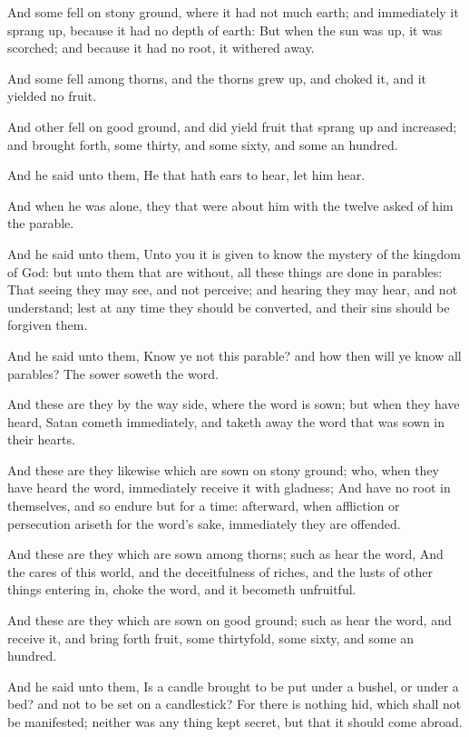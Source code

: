 \Verse And some fell on stony ground, where it had not much earth; and immediately it sprang up, because it had no depth of earth: \Verse But when the sun was up, it was scorched; and because it had no root, it withered away.

\Verse And some fell among thorns, and the thorns grew up, and choked it, and it yielded no fruit.

\Verse And other fell on good ground, and did yield fruit that sprang up and increased; and brought forth, some thirty, and some sixty, and some an hundred.

\Verse And he said unto them, He that hath ears to hear, let him hear.

\Verse And when he was alone, they that were about him with the twelve asked of him the parable.

\Verse And he said unto them, Unto you it is given to know the mystery of the kingdom of God: but unto them that are without, all these things are done in parables: \Verse That seeing they may see, and not perceive; and hearing they may hear, and not understand; lest at any time they should be converted, and their sins should be forgiven them.

\Verse And he said unto them, Know ye not this parable? and how then will ye know all parables?  \Verse The sower soweth the word.

\Verse And these are they by the way side, where the word is sown; but when they have heard, Satan cometh immediately, and taketh away the word that was sown in their hearts.

\Verse And these are they likewise which are sown on stony ground; who, when they have heard the word, immediately receive it with gladness; \Verse And have no root in themselves, and so endure but for a time: afterward, when affliction or persecution ariseth for the word's sake, immediately they are offended.

\Verse And these are they which are sown among thorns; such as hear the word, \Verse And the cares of this world, and the deceitfulness of riches, and the lusts of other things entering in, choke the word, and it becometh unfruitful.

\Verse And these are they which are sown on good ground; such as hear the word, and receive it, and bring forth fruit, some thirtyfold, some sixty, and some an hundred.

\Verse And he said unto them, Is a candle brought to be put under a bushel, or under a bed? and not to be set on a candlestick?  \Verse For there is nothing hid, which shall not be manifested; neither was any thing kept secret, but that it should come abroad.

